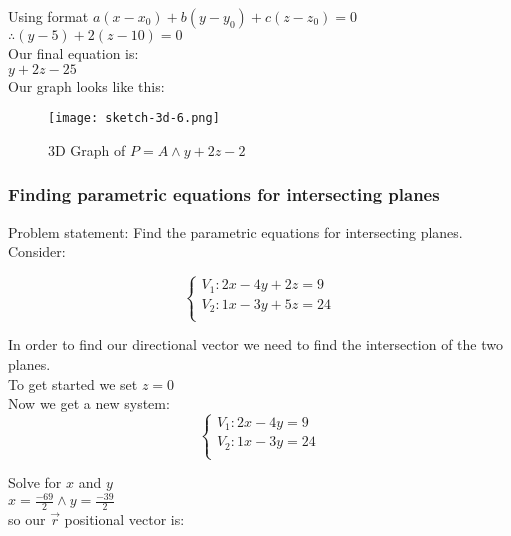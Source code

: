 Using format $a(x - x_0) + b(y - y_0) + c(z - z_0) = 0$ \\

$\therefore (y-5) + 2(z-10) = 0$ \\

Our final equation is: \\ 

$y+2z-25$ \\

Our graph looks like this: \\

\begin{figure}[H]
\centering
\texttt{[image: sketch-3d-6.png]}
\caption{3D Graph of $P=A \land y+2z-2$}
\label{fig:Plane_3D_worked_6}
\end{figure}

\subsubsection{Finding parametric equations for intersecting planes}

Problem statement: Find the parametric equations for intersecting planes. \\

Consider:

\[
\begin{cases}
V_1: 2x-4y+2z=9 \\
V_2: 1x-3y+5z=24 \\
\end{cases}
\]

In order to find our directional vector we need to find the intersection of the two planes. \\

To get started we set $z=0$ \\

Now we get a new system: \\

\[
\begin{cases}
V_1: 2x-4y=9 \\
V_2: 1x-3y=24 \\
\end{cases}
\]

Solve for $x$ and $y$ \\

$x = \frac{-69}{2} \land y = \frac{-39}{2}$ \\

so our $\vec{r}$ positional vector is: \\

